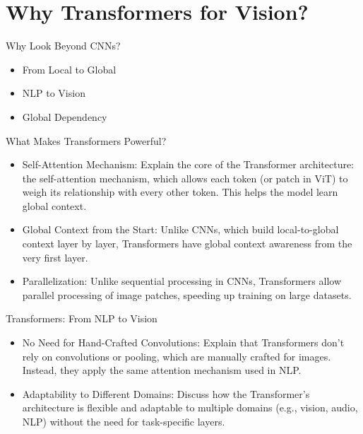 \section{Why Transformers for Vision?}

\begin{frame}{Why Look Beyond CNNs?}
    \begin{itemize}
        \item From Local to Global %
	    \item NLP to Vision %
	    \item Global Dependency %
    \end{itemize}
\end{frame}

\begin{frame}{What Makes Transformers Powerful?}
    \begin{itemize}
        \item Self-Attention Mechanism: Explain the core of the Transformer architecture: the self-attention mechanism, which allows each token (or patch in ViT) to weigh its relationship with every other token. This helps the model learn global context.
        \item Global Context from the Start: Unlike CNNs, which build local-to-global context layer by layer, Transformers have global context awareness from the very first layer.
        \item Parallelization: Unlike sequential processing in CNNs, Transformers allow parallel processing of image patches, speeding up training on large datasets.
    \end{itemize}
\end{frame}


\begin{frame}{Transformers: From NLP to Vision}
    \begin{itemize}
        \item No Need for Hand-Crafted Convolutions: Explain that Transformers don’t rely on convolutions or pooling, which are manually crafted for images. Instead, they apply the same attention mechanism used in NLP.
	    \item Adaptability to Different Domains: Discuss how the Transformer’s architecture is flexible and adaptable to multiple domains (e.g., vision, audio, NLP) without the need for task-specific layers.
    \end{itemize}
\end{frame}